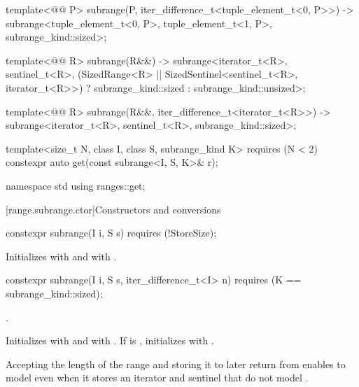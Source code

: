 \begin{codeblock}
{  template<@@ P>
    subrange(P, iter_difference_t<tuple_element_t<0, P>>) ->
      subrange<tuple_element_t<0, P>, tuple_element_t<1, P>, subrange_kind::sized>;

  template<@@ R>
    subrange(R&&) ->
      subrange<iterator_t<R>, sentinel_t<R>,
               (SizedRange<R> || SizedSentinel<sentinel_t<R>, iterator_t<R>>)
                 ? subrange_kind::sized : subrange_kind::unsized>;

  template<@@ R>
    subrange(R&&, iter_difference_t<iterator_t<R>>) ->
      subrange<iterator_t<R>, sentinel_t<R>, subrange_kind::sized>;

  template<size_t N, class I, class S, subrange_kind K>
    requires (N < 2)
  constexpr auto get(const subrange<I, S, K>& r);
}

namespace std {
  using ranges::get;
}
\end{codeblock}

[range.subrange.ctor]{Constructors and conversions}

%
\begin{itemdecl}
constexpr subrange(I i, S s) requires (!StoreSize);
\end{itemdecl}

\begin{itemdescr}
\pnum
\effects Initializes  with  and  with
.
\end{itemdescr}

%
\begin{itemdecl}
constexpr subrange(I i, S s, iter_difference_t<I> n)
  requires (K == subrange_kind::sized);
\end{itemdecl}

\begin{itemdescr}
\pnum
\expects {}.

\pnum
\effects Initializes  with  and  with
. If  is , initializes  with
.

\pnum
\begin{note}
Accepting the length of the range and storing it to later return  from
 enables  to model  even
when it stores an iterator and sentinel that do not model
.
\end{note}
\end{itemdescr}

